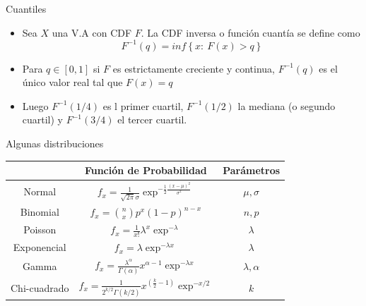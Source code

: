 \documentclass[handout]{beamer}
\begin{document}
\begin{frame}{Cuantiles}
\scriptsize{
\begin{itemize}
 \item Sea $X$ una V.A con CDF $F$. La CDF inversa o función cuantía se define como \begin{displaymath}
                                                                                   F^{-1}(q)= inf \left\{ x: \ F(x) > q \right\}
                                                                                     \end{displaymath}
 \item Para $q \in [0,1]$ si $F$ es estrictamente creciente y continua, $F^{-1}(q)$ es el único valor real tal que $F(x)=q$
 \item Luego $F^{-1}(1/4)$ es l primer cuartil, $F^{-1}(1/2)$ la mediana (o segundo cuartil) y $F^{-1}(3/4)$ el tercer cuartil.
 
 
\end{itemize}

}

\end{frame}




\begin{frame}{Algunas distribuciones}
\scriptsize{ 

\begin{table}
\centering
\begin{tabular}{c|c|c}
\hline
  & Función de Probabilidad & Parámetros   \\ 
\hline
Normal & $f_x=\frac{1}{\sqrt{2\pi}\sigma}\exp^{-\frac{1}{2}\frac{(x-\mu)^2}{\sigma^{2}}}$ & $\mu, \sigma$ \\ \hline
Binomial & $f_x= {n \choose x}p^{x}(1-p)^{n-x} $ & $n,p$ \\ \hline
Poisson & $f_x=\frac{1}{x!}\lambda^{x}\exp^{-\lambda}$ & $\lambda$ \\ \hline
Exponencial & $f_x= \lambda \exp^{-\lambda x}$  & $\lambda$ \\ \hline
Gamma & $f_x= \frac{\lambda^{\alpha}}{\Gamma(\alpha)} x^{\alpha -1}\exp^{-\lambda x} $ & $\lambda , \alpha$ \\ \hline
Chi-cuadrado & $f_x=\frac{1}{2^{k/2} \Gamma(k/2)} x^{(\frac{k}{2} -1)} \exp^{-x/2} $  & $k$  \\
\hline
\end{tabular}
\end{table}

}
\end{frame}
\end{document}
